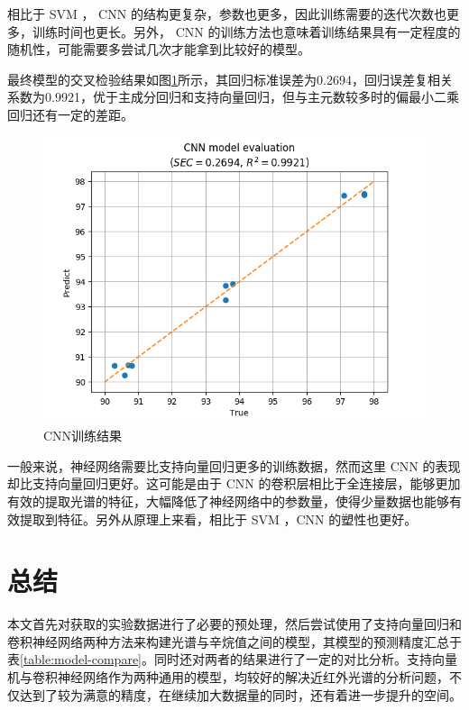 \documentclass[a4paper, 12pt]{article}
\begin{document}
			相比于 SVM ， CNN 的结构更复杂，参数也更多，因此训练需要的迭代次数也更多，训练时间也更长。另外， CNN 的训练方法也意味着训练结果具有一定程度的随机性，可能需要多尝试几次才能拿到比较好的模型。
			
			最终模型的交叉检验结果如图\ref{fig:cnnresult}所示，其回归标准误差为0.2694，回归误差复相关系数为0.9921，优于主成分回归和支持向量回归，但与主元数较多时的偏最小二乘回归还有一定的差距。
			
			\begin{figure}
				\centering
				\includegraphics[width=\linewidth]{../img/cnn_result}
				\caption{CNN训练结果}
				\label{fig:cnnresult}
			\end{figure}
			
			一般来说，神经网络需要比支持向量回归更多的训练数据，然而这里 CNN 的表现却比支持向量回归更好。这可能是由于 CNN 的卷积层相比于全连接层，能够更加有效的提取光谱的特征，大幅降低了神经网络中的参数量，使得少量数据也能够有效提取到特征。另外从原理上来看，相比于 SVM ，CNN 的塑性也更好。
			
	\section{总结}
		本文首先对获取的实验数据进行了必要的预处理，然后尝试使用了支持向量回归和卷积神经网络两种方法来构建光谱与辛烷值之间的模型，其模型的预测精度汇总于表\ref{table:model-compare}。同时还对两者的结果进行了一定的对比分析。支持向量机与卷积神经网络作为两种通用的模型，均较好的解决近红外光谱的分析问题，不仅达到了较为满意的精度，在继续加大数据量的同时，还有着进一步提升的空间。
		
\end{document}
